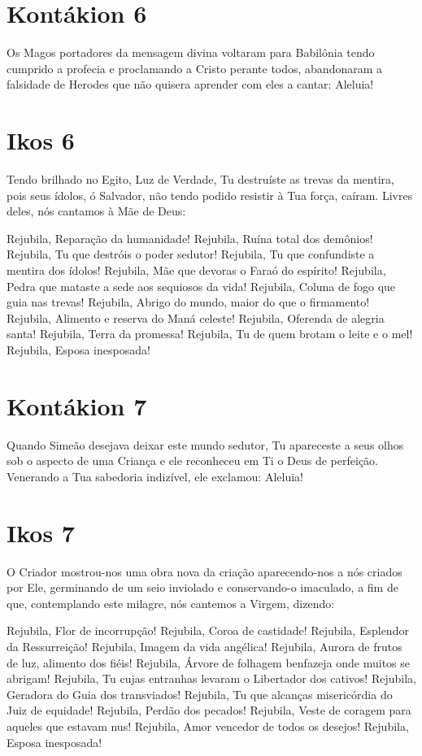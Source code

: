 \documentclass{subfiles}
\begin{document}
\section*{Kontákion 6}

Os Magos portadores da mensagem divina voltaram para Babilônia
tendo cumprido a profecia e proclamando a Cristo perante todos,
abandonaram a falsidade de Herodes que não quisera aprender com eles a
cantar: Aleluia!

\section*{Ikos 6}

Tendo brilhado no Egito, Luz de Verdade, Tu destruíste as trevas da
mentira, pois seus ídolos, ó Salvador, não tendo podido resistir à Tua força,
caíram. Livres deles, nós cantamos à Mãe de Deus:

Rejubila, Reparação da humanidade!
Rejubila, Ruína total dos demônios!
Rejubila, Tu que destróis o poder sedutor!
Rejubila, Tu que confundiste a mentira dos ídolos!
Rejubila, Mãe que devoras o Faraó do espírito!
Rejubila, Pedra que mataste a sede aos sequiosos da vida!
Rejubila, Coluna de fogo que guia nas trevas!
Rejubila, Abrigo do mundo, maior do que o firmamento!
Rejubila, Alimento e reserva do Maná celeste!
Rejubila, Oferenda de alegria santa!
Rejubila, Terra da promessa!
Rejubila, Tu de quem brotam o leite e o mel!
Rejubila, Esposa inesposada!

\section*{Kontákion 7}

Quando Simeão desejava deixar este mundo sedutor, Tu apareceste a
seus olhos sob o aspecto de uma Criança e ele reconheceu em Ti o Deus de
perfeição. Venerando a Tua sabedoria indizível, ele exclamou: Aleluia!

\section*{Ikos 7}

O Criador mostrou-nos uma obra nova da criação aparecendo-nos a
nós criados por Ele, germinando de um seio inviolado e conservando-o
imaculado, a fim de que, contemplando este milagre, nós cantemos a Virgem,
dizendo:

Rejubila, Flor de incorrupção!
Rejubila, Coroa de castidade!
Rejubila, Esplendor da Ressurreição!
Rejubila, Imagem da vida angélica!
Rejubila, Aurora de frutos de luz, alimento dos fiéis!
Rejubila, Árvore de folhagem benfazeja onde muitos se abrigam!
Rejubila, Tu cujas entranhas levaram o Libertador dos cativos!
Rejubila, Geradora do Guia dos transviados!
Rejubila, Tu que alcanças misericórdia do Juiz de equidade!
Rejubila, Perdão dos pecados!
Rejubila, Veste de coragem para aqueles que estavam nus!
Rejubila, Amor vencedor de todos os desejos!
Rejubila, Esposa inesposada!
\end{document}
